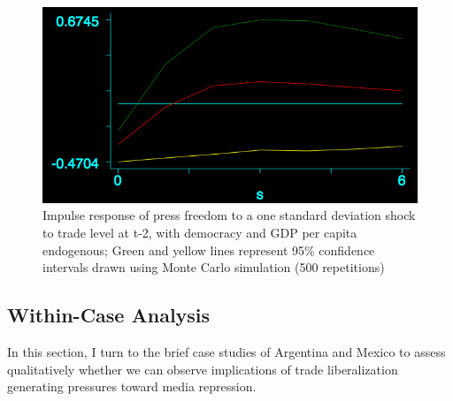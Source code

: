 \documentclass[12pt]{report}
\begin{document}
\begin{centering}
\begin{figure}
\includegraphics[scale=0.5]{article2_var_trade.png}
\caption{Impulse response of press freedom to a one standard deviation shock
to trade level at t-2, with democracy and GDP per capita endogenous;
Green and yellow lines represent 95\% confidence intervals drawn using
Monte Carlo simulation (500 repetitions)}
\end{figure}
\end{centering}


\subsection{Within-Case Analysis}

In this section, I turn to the brief case studies of Argentina and
Mexico to assess qualitatively whether we can observe implications
of trade liberalization generating pressures toward media repression.
\end{document}
